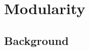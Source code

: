 \documentclass[final,twoside]{book}
\begin{document}
\newcommand{\name}{{\sc 3MT}~}
\newcommand{\Name}{{\sc 3MT}}

\frontmatter





\tableofcontents

\mainmatter






\part{Modularity}

\chapter{Background}

\end{document}

